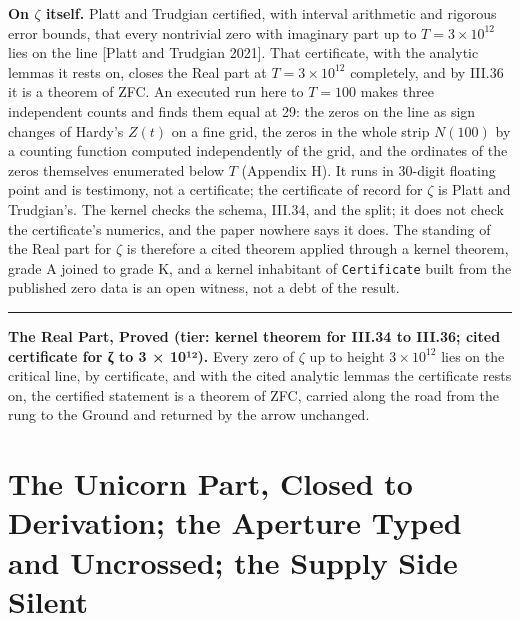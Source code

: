 \documentclass[10pt]{article}
\newcommand{\jboxstart}{\begin{jbox}}
\newcommand{\jboxend}{\end{jbox}}
\newenvironment{jbox}{\par\vspace{2pt}\noindent\color{accent}\rule{\columnwidth}{0.8pt}\par\vspace{-2pt}\small}{\par\vspace{2pt}}
\begin{document}
\textbf{On \(\zeta\) itself.} Platt and Trudgian certified, with
interval arithmetic and rigorous error bounds, that every nontrivial
zero with imaginary part up to \(T = 3 \times 10^{12}\) lies on the line
{[}Platt and Trudgian 2021{]}. That certificate, with the analytic
lemmas it rests on, closes the Real part at \(T = 3 \times 10^{12}\)
completely, and by III.36 it is a theorem of ZFC. An executed run here
to \(T = 100\) makes three independent counts and finds them equal at
29: the zeros on the line as sign changes of Hardy's \(Z(t)\) on a fine
grid, the zeros in the whole strip \(N(100)\) by a counting function
computed independently of the grid, and the ordinates of the zeros
themselves enumerated below \(T\) (Appendix H). It runs in 30-digit
floating point and is testimony, not a certificate; the certificate of
record for \(\zeta\) is Platt and Trudgian's. The kernel checks the
schema, III.34, and the split; it does not check the certificate's
numerics, and the paper nowhere says it does. The standing of the Real
part for \(\zeta\) is therefore a cited theorem applied through a kernel
theorem, grade A joined to grade K, and a kernel inhabitant of
\texttt{Certificate} built from the published zero data is an open
witness, not a debt of the result.

\jboxstart

\textbf{The Real Part, Proved (tier: kernel theorem for III.34 to
III.36; cited certificate for ζ to 3 × 10¹²).} Every zero of \(\zeta\)
up to height \(3 \times 10^{12}\) lies on the critical line, by
certificate, and with the cited analytic lemmas the certificate rests
on, the certified statement is a theorem of ZFC, carried along the road
from the rung to the Ground and returned by the arrow unchanged.

\jboxend

\hypertarget{the-unicorn-part-closed-to-derivation-the-aperture-typed-and-uncrossed-the-supply-side-silent}{%
\section{The Unicorn Part, Closed to Derivation; the Aperture Typed and
Uncrossed; the Supply Side
Silent}\label{the-unicorn-part-closed-to-derivation-the-aperture-typed-and-uncrossed-the-supply-side-silent}}
\end{document}

